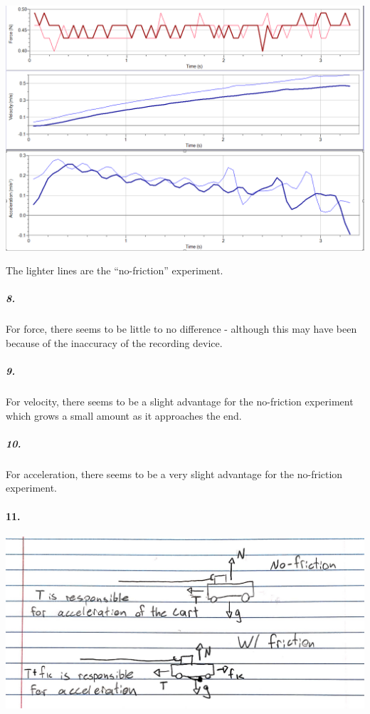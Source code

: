     \begin{mdframed}
        {\centering\includegraphics[width=\textwidth]{image16}}

        The lighter lines are the ``no-friction'' experiment.

        \subparagraph*{8.}
        For force, there seems to be little to no difference - although this may have been because of the inaccuracy of the recording device.

        \subparagraph*{9.}
        For velocity, there seems to be a slight advantage for the no-friction experiment which grows a small amount as it approaches the end.
        
        \subparagraph*{10.}
        For acceleration, there seems to be a very slight advantage for the no-friction experiment.
    \end{mdframed}

    \pagebreak

    \paragraph*{11.}

    \begin{mdframed}
        {\centering\includegraphics[width=\textwidth]{image5}}
    \end{mdframed}

